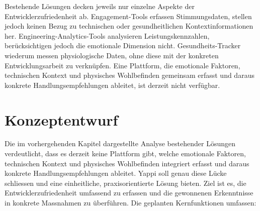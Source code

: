 \documentclass[12pt,a4paper]{report}
\begin{document}
Bestehende Lösungen decken jeweils nur einzelne Aspekte der Entwicklerzufriedenheit ab. Engagement-Tools erfassen Stimmungsdaten,
stellen jedoch keinen Bezug zu technischen oder gesundheitlichen Kontextinformationen her. Engineering-Analytics-Tools analysieren
Leistungskennzahlen, berücksichtigen jedoch die emotionale Dimension nicht. Gesundheits-Tracker wiederum messen physiologische Daten,
ohne diese mit der konkreten Entwicklungsarbeit zu verknüpfen. Eine Plattform, die emotionale Faktoren, technischen Kontext und
physisches Wohlbefinden gemeinsam erfasst und daraus konkrete Handlungsempfehlungen ableitet, ist derzeit nicht verfügbar.

\chapter{Konzeptentwurf}

Die im vorhergehenden Kapitel dargestellte Analyse bestehender Lösungen verdeutlicht, dass es derzeit keine Plattform gibt, welche
emotionale Faktoren, technischen Kontext und physisches Wohlbefinden integriert erfasst und daraus konkrete Handlungsempfehlungen
ableitet. Yappi soll genau diese Lücke schliessen und eine einheitliche, praxisorientierte Lösung bieten. Ziel ist es, die
Entwicklerzufriedenheit umfassend zu erfassen und die gewonnenen Erkenntnisse in konkrete Massnahmen zu überführen. Die geplanten
Kernfunktionen umfassen:
\end{document}
